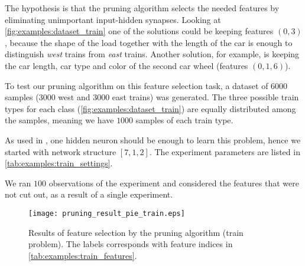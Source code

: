 The hypothesis is that the pruning algorithm selects the needed features by eliminating unimportant input-hidden synapses. Looking at \cref{fig:examples:dataset_train} one of the solutions could be keeping features $ (0, 3) $, because the shape of the load together with the length of the car is enough to distinguish \textit{west} trains from \textit{east} trains. Another solution, for example, is keeping the car length, car type and color of the second car wheel (features $ (0, 1, 6) $).

To test our pruning algorithm on this feature selection task, a dataset of $ 6000 $ samples ($ 3000 $ west and $ 3000 $ east trains) was generated. The three possible train types for each class (\cref{fig:examples:dataset_train}) are equally distributed among the samples, meaning we have $ 1000 $ samples of each train type.

As used in \citep{mozer_smolensky}, one hidden neuron should be enough to learn this problem, hence we started with network structure $ [7, 1, 2] $. The experiment parameters are listed in \cref{tab:examples:train_settings}.

\begin{table}[H]
\centering
{}
\caption{Experiment settings for the train dataset.}
\label{tab:examples:train_settings}
\end{table}

We ran $ 100 $ observations of the experiment and considered the features that were not cut out, as a result of a single experiment.

\begin{figure}[H]
\centering
\texttt{[image: pruning\_result\_pie\_train.eps]}
\caption{Results of feature selection by the pruning algorithm (train problem). The labels corresponds with feature indices in \cref{tab:examples:train_features}.}
\label{fig:examples:pruning_result_pie_train}
\end{figure}


